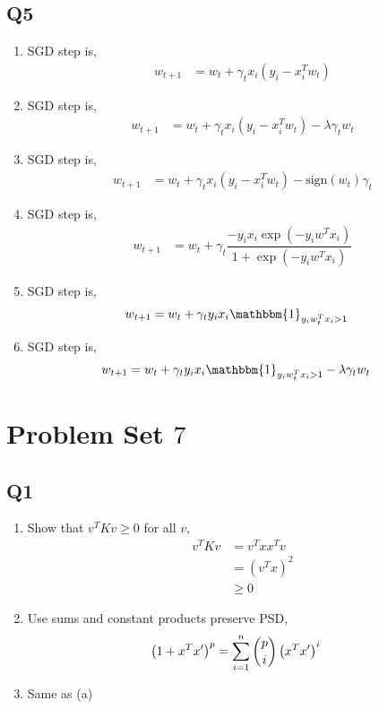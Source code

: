 \documentclass{article}
\begin{document}
\subsection{Q5}
\begin{enumerate}
\item SGD step is,
\begin{align*}
w_{t+1} &= w_{t} + \gamma_{t} x_{i} \left(y_{i} - x_{i}^{T} w_{t}\right)
\end{align*}
\item SGD step is,
\begin{align*}
w_{t+1} &= w_{t} + \gamma_{t} x_{i} \left(y_{i} - x_{i}^{T} w_{t}\right) - \lambda \gamma_{t} w_{t}
\end{align*}
\item SGD step is,
\begin{align*}
w_{t+1} &= w_{t} + \gamma_{t} x_{i} \left(y_{i} - x_{i}^{T} w_{t}\right) - \text{sign}\left(w_{t}\right) \gamma_{t}
\end{align*}
\item SGD step is,
\begin{align*}
w_{t+1} &= w_{t} + \gamma_{t} \dfrac{- y_{i} x_{i} \exp\left(- y_{i} w^{T} x_{i}\right)}{1 + \exp\left(- y_{i} w^{T} x_{i}\right)}
\end{align*}
\item SGD step is,
\begin{align*}
w_{t+1} &= w_{t} + \gamma_{t} y_{i} x_{i} \mathbbm{1}_{y_{i} w_{t}^{T} x_{i} > 1}
\end{align*}
\item SGD step is,
\begin{align*}
w_{t+1} &= w_{t} + \gamma_{t} y_{i} x_{i} \mathbbm{1}_{y_{i} w_{t}^{T} x_{i} > 1} - \lambda \gamma_{t} w_{t}
\end{align*}

\end{enumerate}




\section{Problem Set $7$} 

\subsection{Q1}
\begin{enumerate}
\item Show that $v^{T} K v \geq  0$ for all $v, $
\begin{align*}
v^{T} K v &= v^{T} x x^{T} v
\\ &= \left(v^{T} x\right)^{2}
\\ &\geq  0
\end{align*}
\item Use sums and constant products preserve PSD,
\begin{align*}
\left(1 + x^{T} x'\right)^{p} &= \displaystyle\sum_{i=1}^{n} \dbinom{p}{i} \left(x^{T} x'\right)^{i}
\end{align*}
\item Same as (a)
\end{enumerate}
\end{document}
